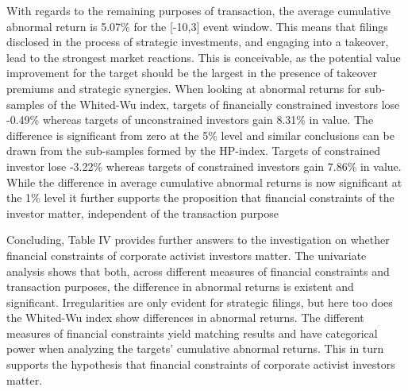 \documentclass[12pt]{article}
\begin{document}
With regards to the remaining purposes of transaction, the average cumulative abnormal return is 5.07\% for the [-10,3] event window. This means that filings disclosed in the process of strategic investments, and engaging into a takeover, lead to the strongest market reactions. This is conceivable, as the potential value improvement for the target should be the largest in the presence of takeover premiums and strategic synergies. When looking at abnormal returns for sub-samples of the Whited-Wu index, targets of financially constrained investors lose -0.49\% whereas targets of unconstrained investors gain 8.31\% in value. The difference is significant from zero at the 5\% level and similar conclusions can be drawn from the sub-samples formed by the HP-index. Targets of constrained investor lose -3.22\% whereas targets of constrained investors gain 7.86\% in value. While the difference in average cumulative abnormal returns is now significant at the 1\% level it further supports the proposition that financial constraints of the investor matter, independent of the transaction purpose\par
Concluding, Table IV provides further answers to the investigation on whether financial constraints of corporate activist investors matter. The univariate analysis shows that both, across different measures of financial constraints and transaction purposes, the difference in abnormal returns is existent and significant. Irregularities are only evident for strategic filings, but here too does the Whited-Wu index show differences in abnormal returns. The different measures of financial constraints yield matching results and have categorical power when analyzing the targets' cumulative abnormal returns. This in turn supports the hypothesis that financial constraints of corporate activist investors matter. 
\end{document}
